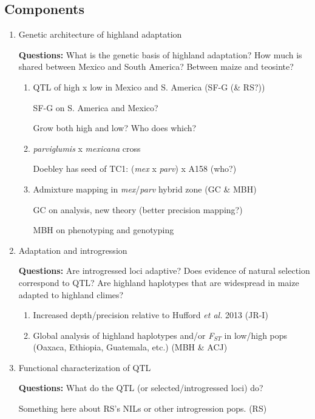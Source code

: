 \documentclass[]{article}
\begin{document}
\subsection*{Components}
\begin{enumerate}
	\item Genetic architecture of highland adaptation
	
	{\bf Questions:} What is the genetic basis of highland adaptation?  How much is shared between Mexico and South America? Between maize and teosinte? 
	\begin{enumerate}
		\item QTL of high x low in Mexico and S. America (SF-G (\& RS?))
		
		SF-G on S. America and Mexico? 
		
		Grow both high and low? Who does which?

		\item \emph{parviglumis} x \emph{mexicana} cross
		
		Doebley has seed of TC1: (\emph{mex} x \emph{parv}) x A158 (who?) 
		\item Admixture mapping in \emph{mex}/\emph{parv} hybrid zone (GC \& MBH)

		GC on analysis, new theory (better precision mapping?)
		
		MBH on phenotyping and genotyping
	\end{enumerate}
	\item Adaptation and introgression
	
	{\bf Questions:} Are introgressed loci adaptive? Does evidence of natural selection correspond to QTL? Are highland haplotypes that are widespread in maize adapted to highland climes?
	\begin{enumerate}	
		\item Increased depth/precision relative to Hufford \emph{et al.} 2013 (JR-I)

		\item Global analysis of highland haplotypes and/or \emph{F$_{ST}$} in low/high pops (Oaxaca, Ethiopia, Guatemala, etc.) (MBH \& ACJ)
	\end{enumerate}
	\item Functional characterization of QTL
	
	{\bf Questions:} What do the QTL (or selected/introgressed loci) do?
	
	Something here about RS's NILs or other introgression pops. (RS)

\end{enumerate}
\end{document}
